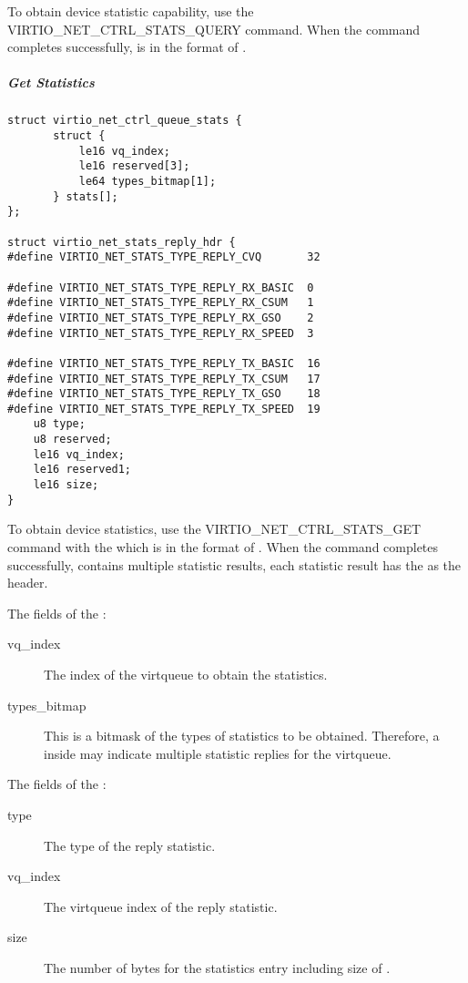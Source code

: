 To obtain device statistic capability, use the VIRTIO_NET_CTRL_STATS_QUERY
command. When the command completes successfully, 
is in the format of .

\subparagraph{Get Statistics}\label{sec:Device Types / Network Device / Device Operation / Control Virtqueue / Device Statistics / Get Statistics}

\begin{lstlisting}
struct virtio_net_ctrl_queue_stats {
       struct {
           le16 vq_index;
           le16 reserved[3];
           le64 types_bitmap[1];
       } stats[];
};

struct virtio_net_stats_reply_hdr {
#define VIRTIO_NET_STATS_TYPE_REPLY_CVQ       32

#define VIRTIO_NET_STATS_TYPE_REPLY_RX_BASIC  0
#define VIRTIO_NET_STATS_TYPE_REPLY_RX_CSUM   1
#define VIRTIO_NET_STATS_TYPE_REPLY_RX_GSO    2
#define VIRTIO_NET_STATS_TYPE_REPLY_RX_SPEED  3

#define VIRTIO_NET_STATS_TYPE_REPLY_TX_BASIC  16
#define VIRTIO_NET_STATS_TYPE_REPLY_TX_CSUM   17
#define VIRTIO_NET_STATS_TYPE_REPLY_TX_GSO    18
#define VIRTIO_NET_STATS_TYPE_REPLY_TX_SPEED  19
    u8 type;
    u8 reserved;
    le16 vq_index;
    le16 reserved1;
    le16 size;
}
\end{lstlisting}

To obtain device statistics, use the VIRTIO_NET_CTRL_STATS_GET command with the
 which is in the format of
. When the command completes
successfully,  contains multiple statistic
results, each statistic result has the 
as the header.

The fields of the :
\begin{description}
    \item [vq_index]
        The index of the virtqueue to obtain the statistics.

    \item [types_bitmap]
        This is a bitmask of the types of statistics to be obtained. Therefore, a
         inside  may
        indicate multiple statistic replies for the virtqueue.
\end{description}

The fields of the :
\begin{description}
    \item [type]
        The type of the reply statistic.

    \item [vq_index]
        The virtqueue index of the reply statistic.

    \item [size]
        The number of bytes for the statistics entry including size of .

\end{description}

